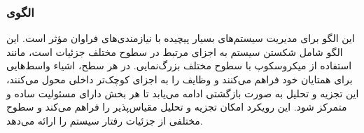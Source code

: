 \subsubsection{الگوی }
\label{archRecContainSec}
\begin{RTL}
این الگو \cite{ref4} برای مدیریت سیستم‌های بسیار پیچیده
با نیازمندی‌های فراوان مؤثر است. این الگو شامل شکستن سیستم به
اجزای مرتبط در سطوح مختلف جزئیات است، مانند استفاده از میکروسکوپ
با سطوح مختلف بزرگ‌نمایی. در هر سطح، اشیاء واسط‌هایی
برای همتایان خود فراهم می‌کنند و وظایف را به اجزای کوچک‌تر داخلی
محول می‌کنند، این تجزیه و تحلیل به صورت بازگشتی ادامه می‌یابد
تا هر بخش دارای مسئولیت ساده و متمرکز شود. این رویکرد امکان تجزیه
و تحلیل مقیاس‌پذیر را فراهم می‌کند و سطوح مختلفی از جزئیات رفتار سیستم را ارائه می‌دهد.
\end{RTL}